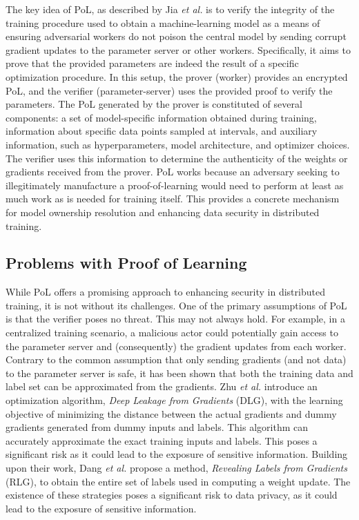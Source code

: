 \documentclass[11pt]{article}
\begin{document}
The key idea of PoL, as described by Jia \textit{et al.}\cite{jia2021proof}  is to verify the integrity of the training procedure used to obtain a machine-learning model as a means of ensuring adversarial workers do not poison the central model by sending corrupt gradient updates to the parameter server or other workers. Specifically, it aims to prove that the provided parameters are indeed the result of a specific optimization procedure. In this setup, the prover (worker) provides an encrypted PoL, and the verifier (parameter-server) uses the provided proof to verify the parameters. The PoL generated by the prover is constituted of several components: a set of model-specific information obtained during training, information about specific data points sampled at intervals, and auxiliary information, such as hyperparameters, model architecture, and optimizer choices. The verifier uses this information to determine the authenticity of the weights or gradients received from the prover. PoL works because an adversary seeking to illegitimately manufacture a proof-of-learning would need to perform at least as much work as is needed for training itself. This provides a concrete mechanism for model ownership resolution and enhancing data security in distributed training.

\subsection*{Problems with Proof of Learning}

While PoL offers a promising approach to enhancing security in distributed training, it is not without its challenges. One of the primary assumptions of PoL is that the verifier poses no threat. This may not always hold. For example, in a centralized training scenario, a malicious actor could potentially gain access to the parameter server and (consequently) the gradient updates from each worker. Contrary to the common assumption that only sending gradients (and not data) to the parameter server is safe, it has been shown that both the training data and label set can be approximated from the gradients.  Zhu \textit{et al.}\cite{zhu2019deep} introduce an optimization algorithm, \textit{Deep Leakage from Gradients} (DLG), with the learning objective of minimizing the distance between the actual gradients and dummy gradients generated from dummy inputs and labels. This algorithm can accurately approximate the exact training inputs and labels. This poses a significant risk as it could lead to the exposure of sensitive information. Building upon their work, Dang \textit{et al.}\cite{NEURIPS2021_0d924f0e} propose a method, \textit{Revealing Labels from Gradients} (RLG), to obtain the entire set of labels used in computing a weight update. The existence of these strategies poses a significant risk to data privacy, as it could lead to the exposure of sensitive information.
\end{document}

